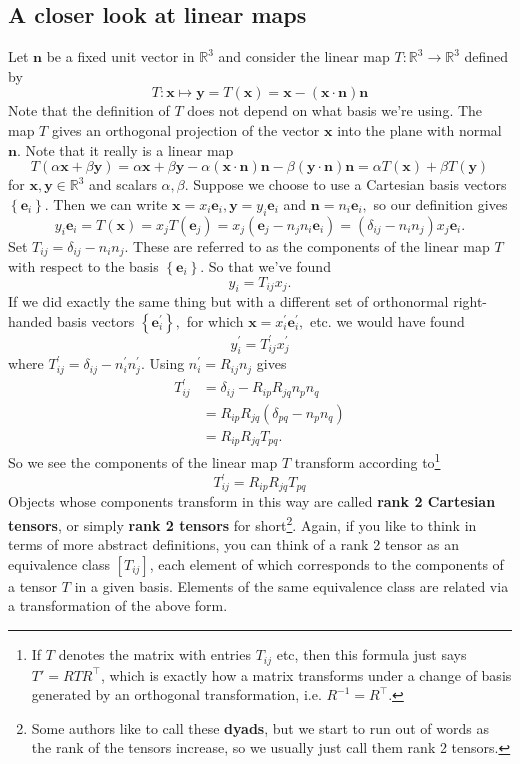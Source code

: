 \subsection{A closer look at linear maps}
Let $\mathbf{n}$ be a fixed unit vector in $\mathbb{R}^{3}$ and consider the linear map $T: \mathbb{R}^{3} \rightarrow \mathbb{R}^{3}$ defined by
\[
T: \mathbf{x} \mapsto \mathbf{y}=T(\mathbf{x})=\mathbf{x}-(\mathbf{x} \cdot \mathbf{n}) \mathbf{n}
\]
Note that the definition of $T$ does not depend on what basis we're using. The map $T$ gives an orthogonal projection of the vector $\mathbf{x}$ into the plane with normal $\mathbf{n}$. Note that it really is a linear map
\[
T(\alpha \mathbf{x}+\beta \mathbf{y})=\alpha \mathbf{x}+\beta \mathbf{y}-\alpha(\mathbf{x} \cdot \mathbf{n}) \mathbf{n}-\beta(\mathbf{y} \cdot \mathbf{n}) \mathbf{n}=\alpha T(\mathbf{x})+\beta T(\mathbf{y})
\]
for $\mathbf{x}, \mathbf{y} \in \mathbb{R}^{3}$ and scalars $\alpha, \beta$. Suppose we choose to use a Cartesian basis vectors $\left\{\mathbf{e}_{i}\right\}$. Then we can write $\mathbf{x}=x_{i} \mathbf{e}_{i}, \mathbf{y}=y_{i} \mathbf{e}_{i}$ and $\mathbf{n}=n_{i} \mathbf{e}_{i},$ so our definition gives
\[
y_{i} \mathbf{e}_{i}=T(\mathbf{x})=x_{j} T\left(\mathbf{e}_{j}\right)=x_{j}\left(\mathbf{e}_{j}-n_{j} n_{i} \mathbf{e}_{i}\right)=\left(\delta_{i j}-n_{i} n_{j}\right) x_{j} \mathbf{e}_{i}.
\]
Set $T_{i j}=\delta_{i j}-n_{i} n_{j} .$ These are referred to as the components of the linear map $T$ with respect to the basis $\left\{\mathbf{e}_{i}\right\}$. So that we've found
\[
y_{i}=T_{i j} x_{j}.
\]
If we did exactly the same thing but with a different set of orthonormal right-handed basis vectors $\left\{\mathbf{e}_{i}^{\prime}\right\},$ for which $\mathbf{x}=x_{i}^{\prime} \mathbf{e}_{i}^{\prime},$ etc. we would have found
\[
y_{i}^{\prime}=T_{i j}^{\prime} x_{j}^{\prime}
\]
where $T_{i j}^{\prime}=\delta_{i j}-n_{i}^{\prime} n_{j}^{\prime} .$ Using $n_{i}^{\prime}=R_{i j} n_{j}$ gives
\[
\begin{aligned}
T_{i j}^{\prime} &=\delta_{i j}-R_{i p} R_{j q} n_{p} n_{q} \\
&=R_{i p} R_{j q}\left(\delta_{p q}-n_{p} n_{q}\right) \\
&=R_{i p} R_{j q} T_{p q}.
\end{aligned}
\]
So we see the components of the linear map $T$ transform according to\footnote{If $T$ denotes the matrix with entries $T_{ij}$ etc, then this
formula just says $ T'=RTR^{\top } $, which is exactly how a matrix transforms under a change of basis generated by an orthogonal transformation, i.e. $ R^{-1}=R^\top $.}
\[
    \boxed{T_{i j}^{\prime}=R_{i p} R_{j q} T_{p q}}
\]
Objects whose components transform in this way are called \textbf{rank 2 Cartesian tensors}, or simply \textbf{rank 2 tensors} for short\footnote{Some authors like to call these \textbf{dyads}, but we start to run out of words as the rank of the tensors increase, so we usually just call them rank 2 tensors.}. Again, if you like to think in terms of more abstract definitions, you can think of a rank 2 tensor as an equivalence class $\left[T_{i j}\right]$, each element of which corresponds to the components of a tensor $T$ in a given basis. Elements of the
same equivalence class are related via a transformation of the above form.